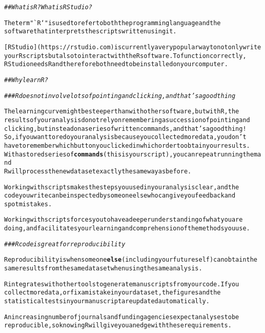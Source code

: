\documentclass{article}\usepackage[]{graphicx}\usepackage[]{xcolor}
\makeatletter
\newcommand{\hlstr}[1]{\textcolor[rgb]{0.192,0.494,0.8}{#1}}%
\newcommand{\hlcom}[1]{\textcolor[rgb]{0.678,0.584,0.686}{\textit{#1}}}%
\newcommand{\hlkwd}[1]{\textcolor[rgb]{0.737,0.353,0.396}{\textbf{#1}}}%
\newenvironment{kframe}{%
 \def\at@end@of@kframe{}%
 \ifinner\ifhmode%
  \def\at@end@of@kframe{\end{minipage}}%
  \begin{minipage}{\columnwidth}%
 \fi\fi%
 \def\FrameCommand##1{\hskip\@totalleftmargin \hskip-\fboxsep
 \colorbox{shadecolor}{##1}\hskip-\fboxsep
     \hskip-\linewidth \hskip-\@totalleftmargin \hskip\columnwidth}%
 \MakeFramed {\advance\hsize-\width
   \@totalleftmargin\z@ \linewidth\hsize
   \@setminipage}}%
 {\par\unskip\endMakeFramed%
 \at@end@of@kframe}
\newenvironment{knitrout}{}{} %
\makeatother
\begin{document}
\begin{knitrout}
\color{fgcolor}\begin{kframe}
\begin{alltt}

\hlcom{## What is R? What is RStudio?}

The term \hlstr{"`R`"} is used to refer to both the programming language and the
software that interprets the scripts written using it.

[RStudio](https://rstudio.com) is currently a very popular way to not only write
your R scripts but also to interact with the R software. To function correctly,
RStudio needs R and therefore both need to be installed on your computer.

\hlcom{## Why learn R?}

\hlcom{### R does not involve lots of pointing and clicking, and that's a good thing}

The learning curve might be steeper than with other software, but with R, the
results of your analysis do not rely on remembering a succession of pointing and
clicking, but instead on a series of written commands, and that's a good thing!
So, if you want to redo your analysis because you collected more data, you don't
have to remember which button you clicked in which order to obtain your results.
With a stored series of \hlkwd{commands} (this is your script), you can repeat running them and
R will process the new dataset exactly the same way as before.

Working with scripts makes the steps you used in your analysis clear, and the
code you write can be inspected by someone else who can give you feedback and
spot mistakes.

Working with scripts forces you to have a deeper understanding of what you are
doing, and facilitates your learning and comprehension of the methods you use.

\hlcom{### R code is great for reproducibility}

Reproducibility is when someone \hlkwd{else} (including your future self) can obtain the
same results from the same dataset when using the same analysis.

R integrates with other tools to generate manuscripts from your code. If you
collect more data, or fix a mistake in your dataset, the figures and the
statistical tests in your manuscript are updated automatically.

An increasing number of journals and funding agencies expect analyses to be
reproducible, so knowing R will give you an edge with these requirements.


\end{alltt}
\end{kframe}
\end{knitrout}
\end{document}
